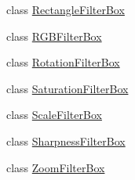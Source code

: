 \begin{DoxyCompactItemize}
class \hyperlink{classGUI_1_1RectangleFilterBox}{Rectangle\+Filter\+Box}
\item 
class \hyperlink{classGUI_1_1RGBFilterBox}{R\+G\+B\+Filter\+Box}
\item 
class \hyperlink{classGUI_1_1RotationFilterBox}{Rotation\+Filter\+Box}
\item 
class \hyperlink{classGUI_1_1SaturationFilterBox}{Saturation\+Filter\+Box}
\item 
class \hyperlink{classGUI_1_1ScaleFilterBox}{Scale\+Filter\+Box}
\item 
class \hyperlink{classGUI_1_1SharpnessFilterBox}{Sharpness\+Filter\+Box}
\item 
class \hyperlink{classGUI_1_1ZoomFilterBox}{Zoom\+Filter\+Box}
\end{DoxyCompactItemize}
